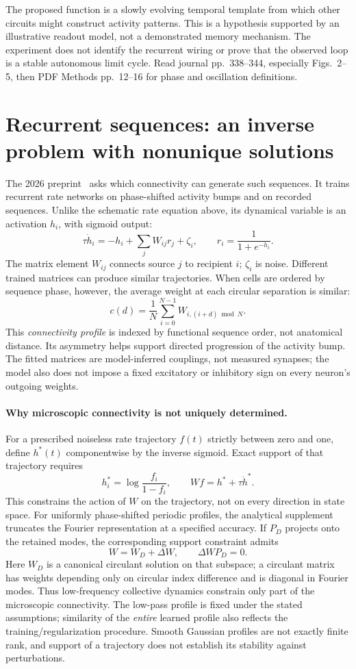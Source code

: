 \documentclass[11pt,a4paper]{article}
\begin{document}
The proposed function is a slowly evolving temporal template from which other circuits might construct activity patterns. This is a hypothesis supported by an illustrative readout model, not a demonstrated memory mechanism. The experiment does not identify the recurrent wiring or prove that the observed loop is a stable autonomous limit cycle. Read journal pp.~338--344, especially Figs.~2--5, then PDF Methods pp.~12--16 for phase and oscillation definitions.

\section{Recurrent sequences: an inverse problem with nonunique solutions}
The 2026 preprint~\cite{recurrent} asks which connectivity can generate such sequences. It trains recurrent rate networks on phase-shifted activity bumps and on recorded sequences. Unlike the schematic rate equation above, its dynamical variable is an activation $h_i$, with sigmoid output:
\[\tau\dot h_i=-h_i+\sum_jW_{ij}r_j+\zeta_i,\qquad r_i=\frac{1}{1+e^{-h_i}}.\]
The matrix element $W_{ij}$ connects source $j$ to recipient $i$; $\zeta_i$ is noise. Different trained matrices can produce similar trajectories. When cells are ordered by sequence phase, however, the average weight at each circular separation is similar:
\[c(d)=\frac{1}{N}\sum_{i=0}^{N-1}W_{i,(i+d)\bmod N}.\]
This \emph{connectivity profile} is indexed by functional sequence order, not anatomical distance. Its asymmetry helps support directed progression of the activity bump. The fitted matrices are model-inferred couplings, not measured synapses; the model also does not impose a fixed excitatory or inhibitory sign on every neuron's outgoing weights.

\paragraph{Why microscopic connectivity is not uniquely determined.}
For a prescribed noiseless rate trajectory $f(t)$ strictly between zero and one, define $h^*(t)$ componentwise by the inverse sigmoid. Exact support of that trajectory requires
\[h_i^*=\log\frac{f_i}{1-f_i},\qquad Wf=h^*+\tau\dot h^*.\]
This constrains the action of $W$ on the trajectory, not on every direction in state space. For uniformly phase-shifted periodic profiles, the analytical supplement truncates the Fourier representation at a specified accuracy. If $P_D$ projects onto the retained modes, the corresponding support constraint admits
\[W=W_D+\Delta W,\qquad \Delta W P_D=0.\]
Here $W_D$ is a canonical circulant solution on that subspace; a circulant matrix has weights depending only on circular index difference and is diagonal in Fourier modes. Thus low-frequency collective dynamics constrain only part of the microscopic connectivity. The low-pass profile is fixed under the stated assumptions; similarity of the \emph{entire} learned profile also reflects the training/regularization procedure. Smooth Gaussian profiles are not exactly finite rank, and support of a trajectory does not establish its stability against perturbations.
\end{document}
